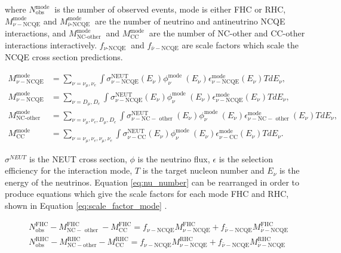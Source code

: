 where $N_{\text {obs }}^{\text {mode }}$ is the number of observed events, mode is either FHC or RHC, $M_{\nu-\mathrm{NCQE}}^{\text {mode }}$ and $M_{\bar{\nu} \text {-NCQE }}^{\text {mode }}$ are the number of neutrino and antineutrino NCQE interactions, and $M_{\mathrm{NC} \text {-other }}^{\text {mode }}$ and  $M_{\mathrm{CC}}^{\text {mode }}$ are the number of NC-other and CC-other interactions interactively. $f_{\nu \text {-NCQE }}$ and $f_{\bar{\nu}-\mathrm{NCQE}}$ are scale factors which scale the NCQE cross section predictions.

\begin{equation}
    \begin{aligned}
    M_{\nu-\mathrm{NCQE}}^{\text {mode }} & =\sum_{\nu=\nu_\mu, \nu_e} \int \sigma_{\nu-\mathrm{NCQE}}^{\mathrm{NEUT}}\left(E_\nu\right) \phi_\nu^{\text {mode }}\left(E_\nu\right) \epsilon_{\nu-\mathrm{NCQE}}^{\text {mode }}\left(E_\nu\right) T d E_\nu, \\
    M_{\nu-\mathrm{NCQE}}^{\text {mode }} & =\sum_{\nu=D_\mu, D_e} \int \sigma_{\nu-\mathrm{NCQE}}^{\mathrm{NEUT}}\left(E_\nu\right) \phi_\nu^{\text {mode }}\left(E_\nu\right) \epsilon_{\nu-\mathrm{NCQE}}^{\text {mode }}\left(E_\nu\right) T d E_\nu, \\
    M_{\mathrm{NC} \text {-other }}^{\text {mode }} & =\sum_{\nu=\nu_\mu, \nu_e, D_\mu, D_e} \int \sigma_{\nu-\mathrm{NC}-\text { other }}^{\mathrm{NEUT}}\left(E_\nu\right) \phi_\nu^{\text {mode }}\left(E_\nu\right) \epsilon_{\nu-\mathrm{NC}-\text { other }}^{\text {mode }}\left(E_\nu\right) T d E_\nu, \\
    M_{\mathrm{CC}}^{\text {mode }} & =\sum_{\nu=\nu_\mu, \nu_e, \nu_\mu, \nu_e} \int \sigma_{\nu-\mathrm{CC}}^{\mathrm{NEUT}}\left(E_\nu\right) \phi_\nu^{\text {mode }}\left(E_\nu\right) \epsilon_{\nu-\mathrm{CC}}^{\text {mode }}\left(E_\nu\right) T d E_\nu .
    \end{aligned}
\label{eq:monte_carlo_events}
\end{equation}


 $\sigma^{NEUT}$ is the NEUT cross section, $\phi$ is the neutrino flux, $\epsilon$ is the selection efficiency for the interaction mode, $T$ is the target nucleon number and $E_{\nu}$ is the energy of the neutrinos. Equation \ref{eq:nu_number} can be rearranged in order to produce equations which give the scale factors for each mode FHC and RHC, shown in Equation \ref{eq:scale_factor_mode} . 

 \begin{equation}
    \begin{aligned}
    & N_{\mathrm{obs}}^{\mathrm{FHC}}-M_{\mathrm{NC}-\text { other }}^{\mathrm{FHC}}-M_{\mathrm{CC}}^{\mathrm{FHC}}=f_{\nu-\mathrm{NCQE}} M_{\nu-\mathrm{NCQE}}^{\mathrm{FHC}}+f_{\bar{\nu}-\mathrm{NCQE}} M_{\bar{\nu}-\mathrm{NCQE}}^{\mathrm{FHC}} \\
    & N_{\mathrm{obs}}^{\mathrm{RHC}}-M_{\mathrm{NC}-\mathrm{other}}^{\mathrm{RHC}}-M_{\mathrm{CC}}^{\mathrm{RHC}}=f_{\nu-\mathrm{NCQE}} M_{\nu-\mathrm{NCQE}}^{\mathrm{RHC}}+f_{\bar{\nu}-\mathrm{NCQE}} M_{\bar{\nu}-\mathrm{NCQE}}^{\mathrm{RHC}}
    \end{aligned}
\label{eq:scale_factor_mode}
\end{equation}


